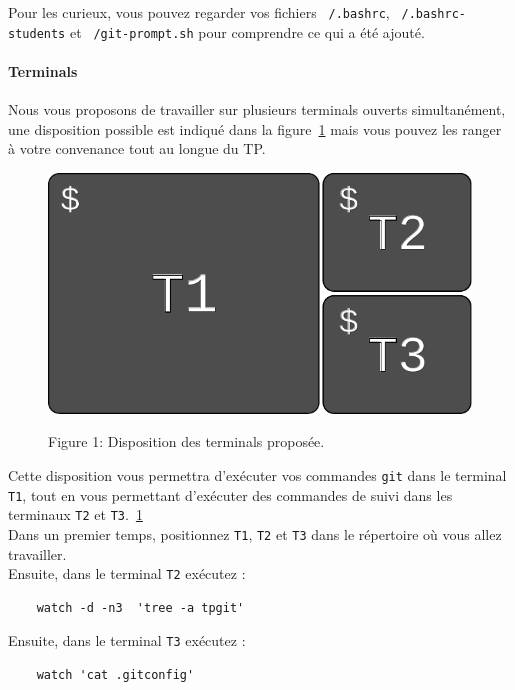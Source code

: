 \documentclass[final, a4paper, openbib, ]{article}
\newcommand{\WR}[1]{\textcolor{purple}{#1}}
\newcommand{\WR}[1]{{#1}}
\begin{document}
Pour les curieux, vous pouvez regarder vos fichiers \texttt{~/.bashrc}, \texttt{~/.bashrc-students} et \texttt{~/git-prompt.sh} pour comprendre ce qui a été ajouté.


\paragraph{Terminals}
Nous vous proposons de travailler sur plusieurs terminals ouverts simultanément, une disposition possible est indiqué dans la figure~\ref{terminals} mais vous pouvez les ranger à votre convenance tout au longue du TP.
\begin{figure}[h]
	\centering
	{\includegraphics[scale=0.5]{images/terminals.pdf}}
	\caption{Figure 1: Disposition des terminals proposée.}
	\label{terminals}
\end{figure}

Cette disposition vous permettra d'exécuter vos commandes \texttt{git} dans le terminal \texttt{T1}, tout en vous permettant d'exécuter des commandes de suivi dans les terminaux \texttt{T2} et \texttt{T3}.~\ref{terminals}\\

Dans un premier temps, positionnez \texttt{T1}, \texttt{T2} et \texttt{T3} dans le répertoire où vous allez travailler.\\

Ensuite, dans le terminal \texttt{T2} exécutez :
\begin{verbatim}
	watch -d -n3  'tree -a tpgit'
\end{verbatim}

Ensuite, dans le terminal \texttt{T3} exécutez :
\begin{verbatim}
	watch 'cat .gitconfig'
\end{verbatim}
\end{document}
